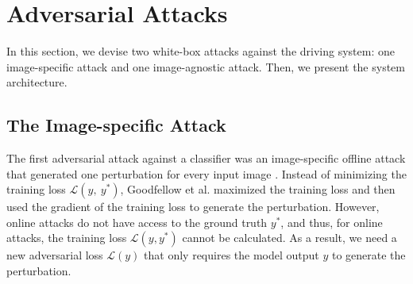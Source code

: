 
\section{Adversarial Attacks} 

In this section, we devise two white-box attacks against the driving system: one image-specific attack and one image-agnostic attack. Then, we present the system architecture.

\subsection{The Image-specific Attack}

The first adversarial attack against a classifier was an image-specific offline attack that generated one perturbation for every input image \citep{goodfellow2014explaining}. Instead of minimizing the training loss $\mathcal{L}(y,\ y^{*})$, Goodfellow et al. maximized the training loss and then used the gradient of the training loss to generate the perturbation. However, online attacks do not have access to the ground truth $y^{*}$, and thus, for online attacks, the training loss $\mathcal{L}(y, y^{*})$ cannot be calculated. As a result, we need a new adversarial loss $\mathcal{L}(y)$ that only requires the model output $y$ to generate the perturbation.

